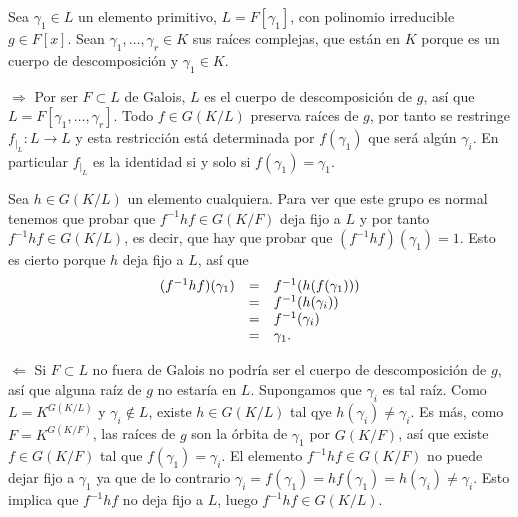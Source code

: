 Sea \(\gamma_1\in L\) un elemento primitivo, \(L=F[\gamma_1]\), con
polinomio irreducible \(g\in F[x]\). Sean
\(\gamma_1,\dots,\gamma_r\in K\) sus raíces complejas, que están en
\(K\) porque es un cuerpo de descomposición y \(\gamma_1\in K\).

\(\Rightarrow\) Por ser \(F\subset L\) de Galois, \(L\) es el cuerpo de
descomposición de \(g\), así que \(L=F[\gamma_1,\dots,\gamma_r]\).
Todo \(f\in G(K/L)\) preserva raíces de \(g\), por tanto se restringe
\(f_{|_{L}}\colon L\rightarrow L\) y esta restricción está determinada
por \(f(\gamma_1)\) que será algún \(\gamma_i\). En particular
\(f_{|_{L}}\) es la identidad si y solo si \(f(\gamma_1)=\gamma_1\).

Sea \(h\in G(K/L)\) un elemento cualquiera. Para ver que este grupo es
normal tenemos que probar que \(f^{-1}hf\in G(K/F)\) deja fijo a \(L\) y
por tanto \(f^{-1}hf\in G(K/L)\), es decir, que hay que probar que
\((f^{-1}hf)(\gamma_1)=1\). Esto es cierto porque \(h\) deja fijo a
\(L\), así que \[
\begin{array}{rcl}
(f^{-1}hf)(\gamma_1)&=&f^{-1}(h(f(\gamma_1)))\cr
&=&f^{-1}(h(\gamma_i))\cr
&=&f^{-1}(\gamma_i)\cr
&=&\gamma_1.
\end{array}
\]

\(\Leftarrow\) Si \(F\subset L\) no fuera de Galois no podría ser el
cuerpo de descomposición de \(g\), así que alguna raíz de \(g\) no
estaría en \(L\). Supongamos que \(\gamma_i\) es tal raíz. Como
\(L=K^{G(K/L)}\) y \(\gamma_i\notin L\), existe \(h\in G(K/L)\) tal qye
\(h(\gamma_i)\neq\gamma_i\). Es más, como \(F=K^{G(K/F)}\), las raíces
de \(g\) son la órbita de \(\gamma_1\) por \(G(K/F)\), así que existe
\(f\in G(K/F)\) tal que \(f(\gamma_1)=\gamma_i\). El elemento
\(f^{-1}hf\in G(K/F)\) no puede dejar fijo a \(\gamma_1\) ya que de lo
contrario
\(\gamma_i=f(\gamma_1)=hf(\gamma_1)=h(\gamma_i)\neq\gamma_i\). Esto
implica que \(f^{-1}hf\) no deja fijo a \(L\), luego
\(f^{-1}hf\in G(K/L)\).

